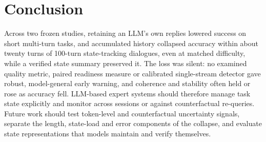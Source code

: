 \section{Conclusion}
\label{sec:conclusion}

Across two frozen studies, retaining an LLM's own replies lowered success on
short multi-turn tasks, and accumulated history collapsed accuracy within about
twenty turns of 100-turn state-tracking dialogues, even at matched difficulty,
while a verified state summary preserved it. The loss was silent: no examined
quality metric, paired readiness measure or calibrated single-stream detector
gave robust, model-general early warning, and coherence and stability often
held or rose as accuracy fell. LLM-based expert systems should therefore manage
task state explicitly and monitor across sessions or against counterfactual
re-queries. Future work should test token-level and counterfactual uncertainty
signals, separate the length, state-load and error components of the collapse,
and evaluate state representations that models maintain and verify themselves.
